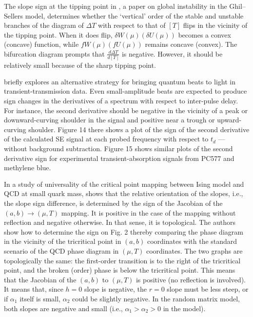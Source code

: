 \documentclass[11pt]{book}
\begin{document}
The slope sign at the tipping point in \cite{bodai2015global}, a paper on global instability in the Ghil–Sellers model, determines
whether the `vertical' order of the stable and unstable branches
of the diagram of $\Delta T$ with respect to that of $\left[T\right]$
flips in the vicinity of the tipping point. When it does flip, $\delta W\left(\mu\right)\left(\delta U\left(\mu\right)\right)$
becomes a convex (concave) function, while $fW\left(\mu\right)\left(fU\left(\mu\right)\right)$
remains concave (convex). The bifurcation diagram prompts that $\frac{d\Delta T}{d[T]}$
is negative. However, it should be relatively small because of the
sharp tipping point.

\cite{cina2016ultrafast} briefly explores an alternative strategy
for bringing quantum beats to light in transient-transmission data.
Even small-amplitude beats are expected to produce sign changes in
the derivatives of a spectrum with respect to inter-pulse delay. For
instance, the second derivative should be negative in the vicinity
of a peak or downward-curving shoulder in the signal and positive
near a trough or upward-curving shoulder. Figure 14 there shows a
plot of the sign of the second derivative of the calculated SE signal
at each probed frequency with respect to $t_{d}$ --- without background
subtraction. Figure 15 shows similar plots of the second derivative
sign for experimental transient-absorption signals from PC577 and
methylene blue.

In a study of universality of the critical point
mapping between Ising model and QCD at small quark mass, \cite{pradeep2019universality} shows that the relative orientation of the
slopes, i.e., the slope sign difference, is determined by the sign
of the Jacobian of the $\left(a,b\right)\rightarrow\left(\mu,T\right)$
mapping. It is positive in the case of the mapping without reflection
and negative otherwise. In that sense, it is topological. The authors
show how to determine the sign on Fig. 2 thereby comparing the phase
diagram in the vicinity of the tricritical point in $\left(a,b\right)$
coordinates with the standard scenario of the QCD phase diagram in
$\left(\mu,T\right)$ coordinates. The two graphs are topologically
the same: the first-order transition is to the right of the tricritical
point, and the broken (order) phase is below the tricritical point.
This means that the Jacobian of the $\left(a,b\right)$ to $\left(\mu,T\right)$
is positive (no reflection is involved). It means that, since $h=0$
slope is negative, the $r=0$ slope must be less steep, or if $\alpha_{1}$
itself is small, $\alpha_{2}$ could be slightly negative. In the
random matrix model, both slopes are negative and small (i.e., $\alpha_{1}>\alpha_{2}>0$
in the model).
\end{document}
